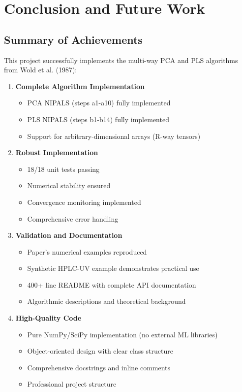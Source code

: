 \documentclass[12pt,a4paper]{article}
\begin{document}
\newpage

\section{Conclusion and Future Work}

\subsection{Summary of Achievements}

This project successfully implements the multi-way PCA and PLS algorithms from Wold et al. (1987):

\begin{enumerate}
    \item \textbf{Complete Algorithm Implementation}
    \begin{itemize}
        \item PCA NIPALS (steps a1-a10) fully implemented
        \item PLS NIPALS (steps b1-b14) fully implemented
        \item Support for arbitrary-dimensional arrays (R-way tensors)
    \end{itemize}

    \item \textbf{Robust Implementation}
    \begin{itemize}
        \item 18/18 unit tests passing
        \item Numerical stability ensured
        \item Convergence monitoring implemented
        \item Comprehensive error handling
    \end{itemize}

    \item \textbf{Validation and Documentation}
    \begin{itemize}
        \item Paper's numerical examples reproduced
        \item Synthetic HPLC-UV example demonstrates practical use
        \item 400+ line README with complete API documentation
        \item Algorithmic descriptions and theoretical background
    \end{itemize}

    \item \textbf{High-Quality Code}
    \begin{itemize}
        \item Pure NumPy/SciPy implementation (no external ML libraries)
        \item Object-oriented design with clear class structure
        \item Comprehensive docstrings and inline comments
        \item Professional project structure
    \end{itemize}
\end{enumerate}
\end{document}
